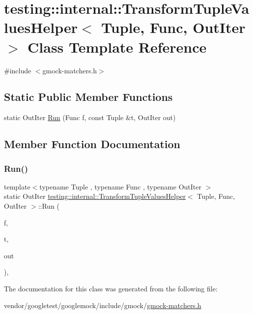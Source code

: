 \hypertarget{classtesting_1_1internal_1_1_transform_tuple_values_helper}{}\section{testing\+:\+:internal\+:\+:Transform\+Tuple\+Values\+Helper$<$ Tuple, Func, Out\+Iter $>$ Class Template Reference}
\label{classtesting_1_1internal_1_1_transform_tuple_values_helper}


{\ttfamily \#include $<$gmock-\/matchers.\+h$>$}

\subsection*{Static Public Member Functions}
\begin{DoxyCompactItemize}
\item 
static Out\+Iter \hyperlink{classtesting_1_1internal_1_1_transform_tuple_values_helper_a27773f284f43c712ec72923a872d35fc}{Run} (Func f, const Tuple \&t, Out\+Iter out)
\end{DoxyCompactItemize}


\subsection{Member Function Documentation}
\mbox{\label{classtesting_1_1internal_1_1_transform_tuple_values_helper_a27773f284f43c712ec72923a872d35fc}} 
\subsubsection{\texorpdfstring{Run()}{Run()}}
{\footnotesize\ttfamily template$<$typename Tuple , typename Func , typename Out\+Iter $>$ \\
static Out\+Iter \hyperlink{classtesting_1_1internal_1_1_transform_tuple_values_helper}{testing\+::internal\+::\+Transform\+Tuple\+Values\+Helper}$<$ Tuple, Func, Out\+Iter $>$\+::Run (\begin{DoxyParamCaption}\item[{Func}]{f,  }\item[{const Tuple \&}]{t,  }\item[{Out\+Iter}]{out }\end{DoxyParamCaption})\hspace{0.3cm}{\ttfamily [inline]}, {\ttfamily [static]}}



The documentation for this class was generated from the following file\+:\begin{DoxyCompactItemize}
\item 
vendor/googletest/googlemock/include/gmock/\hyperlink{gmock-matchers_8h}{gmock-\/matchers.\+h}\end{DoxyCompactItemize}
